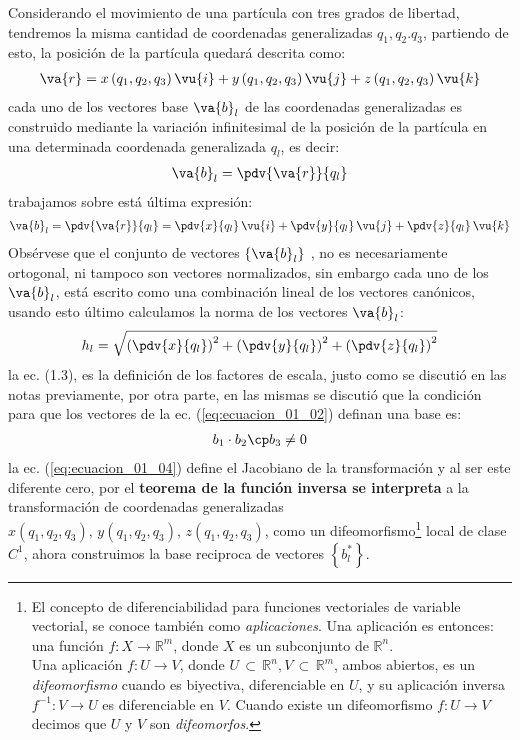 Considerando el movimiento de una partícula con tres grados de libertad, tendremos la misma cantidad de coordenadas generalizadas $q_{1}, q_{2}. q_{3}$, partiendo de esto, la posición de la partícula quedará descrita como:
\begin{align}
\va{r} = x \, (q_{1}, q_{2}, q_{3}) \, \vu{i} + y \, (q_{1}, q_{2}, q_{3}) \, \vu{j} + z \, (q_{1}, q_{2}, q_{3}) \, \vu{k}
\label{eq:ecuacion_01_01}
\end{align}
cada uno de los vectores base $\va{b}_{l}$ de las coordenadas generalizadas es construido mediante la variación infinitesimal de la posición de la partícula en una determinada coordenada generalizada $q_{{l}}$, es decir:
\begin{align*}
\va{b}_{l} = \pdv{\va{r}}{q_{l}}
\end{align*}
trabajamos sobre está última expresión:
\begin{align}
\va{b}_{l} = \pdv{\va{r}}{q_{l}} = \pdv{x}{q_{l}} \, \vu{i} + \pdv{y}{q_{l}} \, \vu{j} + \pdv{z}{q_{l}} \, \vu{k}
\label{eq:ecuacion_01_02}
\end{align}
Obsérvese que el conjunto de vectores $\left\{ \va{b}_{l} \right\}$ , no es necesariamente ortogonal, ni tampoco son vectores normalizados, sin embargo cada uno de los $\va{b}_{l}$, está escrito como una combinación lineal de los vectores canónicos, usando esto último calculamos la norma de los vectores $\va{b}_{l}$:
\begin{align}
h_{l} = \sqrt{\left( \pdv{x}{q_{l}} \right)^{2} + \left( \pdv{y}{q_{l}} \right)^{2} + \left( \pdv{z}{q_{l}} \right)^{2}}
\label{eq:ecuacion_01_03}
\end{align}
la ec. (1.3), es la definición de los factores de escala, justo como se discutió en las notas previamente, por otra parte, en las mismas se discutió que la condición para que los vectores de la ec. (\ref{eq:ecuacion_01_02}) definan una base es:
\begin{align}
b_{1} \cdot b_{2} \cp b_{3} \neq 0
\label{eq:ecuacion_01_04}
\end{align}
la ec. (\ref{eq:ecuacion_01_04}) define el Jacobiano de la transformación y al ser este diferente cero, por el \textbf{teorema de la función inversa se interpreta} a la transformación de coordenadas generalizadas $x(q_{1}, q_{2}, q_{3}), \, y(q_{1}, q_{2}, q_{3}), \, z(q_{1}, q_{2}, q_{3})$, como un difeomorfismo\footnote{El concepto de diferenciabilidad para funciones vectoriales de variable vectorial, se conoce también como \emph{aplicaciones}. Una aplicación es entonces: una función $f : X \to \mathbb{R}^{m}$, donde $X$ es un subconjunto de $\mathbb{R}^{n}$. \\ Una aplicación $f : U \to V$, donde $U \, \subset \, \mathbb{R}^{n}, V \, \subset \, \mathbb{R}^{m}$, ambos abiertos, es un \emph{difeomorfismo} cuando es biyectiva, diferenciable en $U$, y su aplicación inversa $f^{-1} : V \to U$ es diferenciable en $V$. Cuando existe un difeomorfismo $f : U \to V$ decimos que $U$ y $V$ son \emph{difeomorfos}.} local de clase $C^{1}$, ahora construimos la base reciproca de vectores $\left\{ b_{l}^{*} \right\}$.

